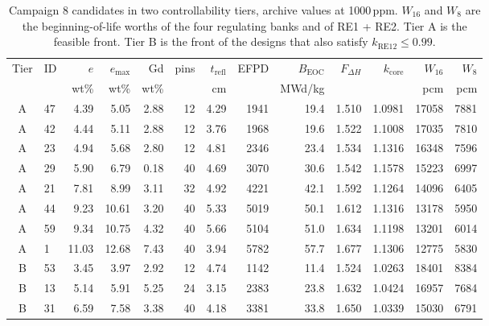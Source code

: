 
\begin{table}[htbp]
  \centering
  \footnotesize
  \caption{Campaign 8 candidates in two controllability tiers, archive values at 1000\,ppm. $W_{16}$ and $W_8$ are the beginning-of-life worths of the four regulating banks and of RE1 + RE2. Tier A is the feasible front. Tier B is the front of the designs that also satisfy $k_\mathrm{RE12} \leq 0.99$.}
  \label{tab:c8-post-tiers}
  \setlength{\tabcolsep}{3pt}\scriptsize
  \begin{tabular}{@{}c l r r r r r r r r r r r@{}}
    \toprule
    Tier & ID & $e$ & $e_\mathrm{max}$ & Gd & pins & $t_\mathrm{refl}$ & EFPD & $B_\mathrm{EOC}$ & $F_{\Delta H}$ & $k_\mathrm{core}$ & $W_{16}$ & $W_8$ \\
         &    & wt\% & wt\% & wt\% &  & cm &  & MWd/kg &  &  & pcm & pcm \\
    \midrule
    A & 47 & 4.39 & 5.05 & 2.88 & 12 & 4.29 & 1941 & 19.4 & 1.510 & 1.0981 & 17058 & 7881 \\
    A & 42 & 4.44 & 5.11 & 2.88 & 12 & 3.76 & 1968 & 19.6 & 1.522 & 1.1008 & 17035 & 7810 \\
    A & 23 & 4.94 & 5.68 & 2.80 & 12 & 4.81 & 2346 & 23.4 & 1.534 & 1.1316 & 16348 & 7596 \\
    A & 29 & 5.90 & 6.79 & 0.18 & 40 & 4.69 & 3070 & 30.6 & 1.542 & 1.1578 & 15223 & 6997 \\
    A & 21 & 7.81 & 8.99 & 3.11 & 32 & 4.92 & 4221 & 42.1 & 1.592 & 1.1264 & 14096 & 6405 \\
    A & 44 & 9.23 & 10.61 & 3.20 & 40 & 5.33 & 5019 & 50.1 & 1.612 & 1.1316 & 13178 & 5950 \\
    A & 59 & 9.34 & 10.75 & 4.32 & 40 & 5.66 & 5104 & 51.0 & 1.634 & 1.1198 & 13201 & 6014 \\
    A & 1 & 11.03 & 12.68 & 7.43 & 40 & 3.94 & 5782 & 57.7 & 1.677 & 1.1306 & 12775 & 5830 \\
    \midrule
    B & 53 & 3.45 & 3.97 & 2.92 & 12 & 4.74 & 1142 & 11.4 & 1.524 & 1.0263 & 18401 & 8384 \\
    B & 13 & 5.14 & 5.91 & 5.25 & 24 & 3.15 & 2383 & 23.8 & 1.632 & 1.0424 & 16957 & 7684 \\
    B & 31 & 6.59 & 7.58 & 3.38 & 40 & 4.18 & 3381 & 33.8 & 1.650 & 1.0339 & 15030 & 6791 \\
    \bottomrule
  \end{tabular}
\end{table}

